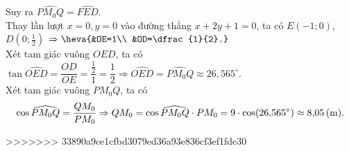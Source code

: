 \begin{ex}
{\begin{enumerate}[+)]
	\end{enumerate}
	Suy ra $\widehat{PM_0Q}=\widehat{FED}$.\\
	Thay lần lượt $x=0, y=0$ vào đường thẳng $x+2y+1=0$, ta có $E(-1;0)$, $D\left(0;\frac{1}{2}\right)$ $\Rightarrow \heva{&OE=1\\ &OD=\dfrac{1}{2}.}$\\
	Xét tam giác vuông $OED$, ta có $\tan\widehat{OED}=\dfrac{OD}{OE}=\dfrac{\frac{1}{2}}{1} =\dfrac{1}{2} \Rightarrow \widehat{OED}=\widehat{PM_0Q}\approx26{,}565^\circ$.\\
	Xét tam giác vuông $PM_0Q$, ta có $$\cos\widehat{PM_0Q}=\dfrac{QM_0}{PM_0} \Rightarrow QM_0=\cos\widehat{PM_0Q}\cdot PM_0 =9\cdot\cos(26{,}565^\circ)\approx8{,}05\, (\rm m).$$
	}
\end{ex}

>>>>>>> 33890a9ce1cfbd3079ed36a93e836cf3ef1fde30
